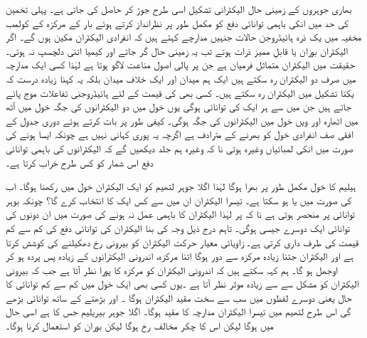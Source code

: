 بھاری جوہروں کے زمینی حال الیکٹرانی تشکیل اسی طرح جوڑ کر حاصل کی جاتی ہے۔ پہلی تخمین کی حد میں انکی باہمی توانائی دفع کو مکمل طور پر نظرانداز کرتے ہوئے بار  کے مرکزہ کے کولمب مخفیہ میں یک ذرہ ہائیڈروجن حالات  جنہیں مدارچے کہتے ہیں کہ انفرادی الیکٹران مکین ہوں گے۔ اگر الیکٹران بوزان یا قابلِ ممیز ذرات ہوتے تب یہ زمینی حال  گر جاتے اور کیمیا اتنی دلچسپ نہ ہوتی۔ حقیقت میں الیکٹران متماثل فرمیان ہے جن پر پالی اصول مناعت لاگو ہوتا ہے لہٰذا کسی ایک مدارچہ میں صرف دو الیکٹران رہ سکتے ہیں ایک ہم میدان اور ایک خلاف میدان بلکہ یہ کہنا زیادہ درست کہ یکتا  تشکیل  میں الیکٹران رہ سکتے ہیں۔ کسی بھی  کی قیمت کے لئے  ہائیڈروجنی تفاعلات موج پائے جاتے ہیں جن میں سے ہر ایک کی توانائی  ہوگی یوں  خول میں دو الیکٹرانوں کی جگہ  خول میں آٹھ  میں اٹھارہ اور ویں خول میں  الیکٹرانوں کی جگہ ہوگی۔ کیفی طور پر بات کرتے ہوئے دوری جدول کے افقی صف انفرادی خول کو  بھرنے کے مترادف ہے اگرچہ یہ پوری کہانی نہیں ہے چونکہ ایسا ہونے کی صورت میں انکی لمبائیاں  وغیرہ ہوتی نا کہ  وغیرہ ہم جلد دیکھیں گے کہ الیکٹرانوں کی باہمی توانائی دفع اس شمار کو کس طرح خراب کرتا ہے۔

ہیلیم کا  خول مکمل طور پر بھرا ہوگا لہٰذا اگلا جوہر لتھیم  کو ایک الیکٹران  خول میں رکھنا ہوگا۔ اب  کی صورت میں  یا  ہو سکتا ہے۔ تیسرا الیکٹران ان میں سے کس ایک کا انتخاب کرے گا؟ چونکہ بوہر توانائی  پر منحصر ہوتی ہے نا کہ  پر لہٰذا الیکٹران کا باہمی عمل نہ ہونے کی صورت میں ان دونوں کی توانائی ایک دوسرے جیسی ہوگی۔ تاہم درج ذیل وجہ کی بنا الیکٹران کی توانائی دفع    کی کم سے کم قیمت کی طرف داری کرتی ہے۔  زاویائی معیار حرکت الیکٹران کو بیرونی رخ دھکیلنے کی کوشش کرتا ہے اور الیکٹران جتنا  زیادہ  مرکزہ سے دور ہوگا  اتنا مرکزہ،  اندرونی الیکٹرانوں  کے زیادہ پس پردہ ہو  کر اوجھل ہو گا۔  ہم کہہ سکتے ہیں کہ اندرونی الیکٹران کو مرکزہ کا پورا   نظر آتا ہے جب کہ بیرونی الیکٹران کو مشکل سے    سے زیادہ موثر  نظر آتا ہے ۔یوں کسی بھی ایک خول میں کم سے کم توانائی کا حال یعنی دوسرے لفظوں میں سب سے سخت مقید الیکٹران     ہوگا ۔ اور بڑھتے      کے ساتھ توانائی بڑھے گی اس طرح لتھیم میں تیسرا الیکٹران مدارچہ     کا مقید ہوگا۔ اگلا جوہر بیریلیم جس کا      ہے اسی حال میں ہوگا لیکن اس کا چکر مخالف رخ ہوگا لیکن بوران      کو     استعمال کرنا ہوگا۔ 
 
